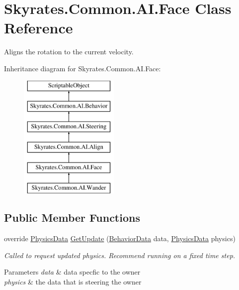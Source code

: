 \hypertarget{class_skyrates_1_1_common_1_1_a_i_1_1_face}{\section{Skyrates.\-Common.\-A\-I.\-Face Class Reference}
\label{class_skyrates_1_1_common_1_1_a_i_1_1_face}
}


Aligns the rotation to the current velocity.  


Inheritance diagram for Skyrates.\-Common.\-A\-I.\-Face\-:\begin{figure}[H]
\begin{center}
\leavevmode
\includegraphics[height=6.000000cm]{class_skyrates_1_1_common_1_1_a_i_1_1_face}
\end{center}
\end{figure}
\subsection*{Public Member Functions}
\begin{DoxyCompactItemize}
\item 
\hypertarget{class_skyrates_1_1_common_1_1_a_i_1_1_face_a18d2ee660595efed92a674d107d4cf02}{override \hyperlink{class_skyrates_1_1_common_1_1_a_i_1_1_physics_data}{Physics\-Data} \hyperlink{class_skyrates_1_1_common_1_1_a_i_1_1_face_a18d2ee660595efed92a674d107d4cf02}{Get\-Update} (\hyperlink{class_skyrates_1_1_common_1_1_a_i_1_1_behavior_data}{Behavior\-Data} data, \hyperlink{class_skyrates_1_1_common_1_1_a_i_1_1_physics_data}{Physics\-Data} physics)}\label{class_skyrates_1_1_common_1_1_a_i_1_1_face_a18d2ee660595efed92a674d107d4cf02}

\begin{DoxyCompactList}\small\item\em Called to request updated physics. Recommend running on a fixed time step. 


\begin{DoxyParams}{Parameters}
{\em data} & data specfic to the owner\\
\hline
{\em physics} & the data that is steering the owner\\
\hline
\end{DoxyParams}
 \end{DoxyCompactList}\end{DoxyCompactItemize}

